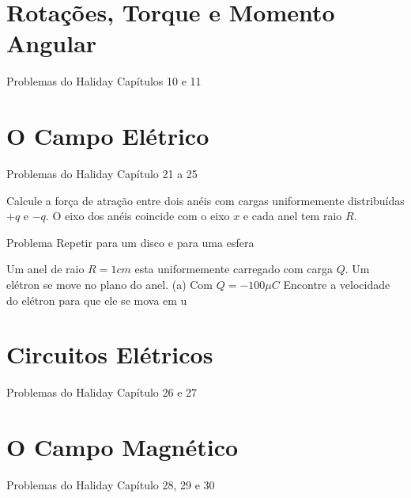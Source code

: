 \documentclass[12pt,a4paper,titlepage,portuges,twoside,final]{book}
\begin{document}

	
	\newpage
	\frontmatter

	
	\baselineskip 0.7cm  \tableofcontents
	\newpage
	\renewcommand\lstlistlistingname{Lista de Códigos Computacionais}
	\lstlistoflistings
	
\mainmatter	
\pagestyle{headings}
\setcounter{page}{1}














\chapter{Rotações, Torque e Momento Angular}
Problemas do Haliday Capítulos 10 e 11













\chapter{O Campo Elétrico}
Problemas do Haliday Capítulo 21 a 25

Calcule a força de atração entre dois anéis com cargas uniformemente distribuídas $+q$ e $-q$. O eixo dos anéis coincide com o eixo $x$ e cada anel tem raio $R$.

Problema Repetir para um disco e para uma esfera

Um anel de raio $R = 1 cm$ esta uniformemente carregado com carga $Q$. Um elétron se move no plano do anel. (a) Com  $Q= -100 \mu C$ Encontre a velocidade do elétron para que ele se mova  em u

\chapter{Circuitos Elétricos}
Problemas do Haliday Capítulo 26 e 27

\chapter{O Campo Magnético}
Problemas do Haliday Capítulo 28, 29 e 30
\end{document}
